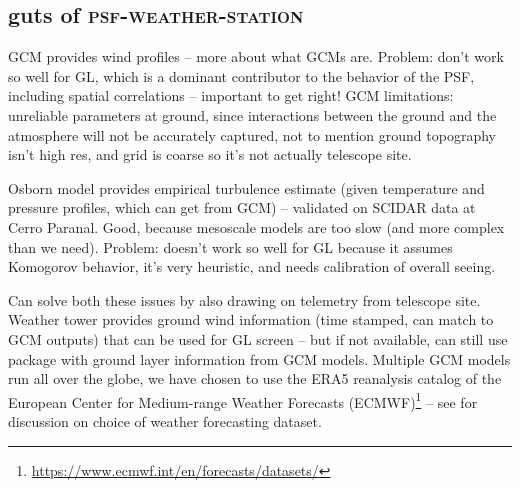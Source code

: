 \documentclass[twocolumn]{aastex631}
\newcommand{\psfws}{\textsc{psf-weather-station}\xspace}
\newcommand{\osborn}{OS18\xspace}
\begin{document}
\subsection{guts of \psfws}

GCM provides wind profiles -- more about what GCMs are.
Problem: don't work so well for GL, which is a dominant contributor to the behavior of the PSF, including spatial correlations -- important to get right!
GCM limitations: unreliable parameters at ground, since interactions between the ground and the atmosphere will not be accurately captured, not to mention ground topography isn't high res, and grid is coarse so it's not actually telescope site. 

Osborn model provides empirical turbulence estimate (given temperature and pressure profiles, which can get from GCM)  -- validated on SCIDAR data \citep{osborn_optical_2018} at Cerro Paranal. 
Good, because mesoscale models are too slow (and more complex than we need).
Problem: doesn't work so well for GL because it assumes Komogorov behavior, it's very heuristic, and needs calibration of overall seeing.



Can solve both these issues by also drawing on telemetry from telescope site. 
Weather tower provides ground wind information (time stamped, can match to GCM outputs) that can be used for GL screen -- but if not available, can still use package with ground layer information from GCM models.
Multiple GCM models run all over the globe, we have chosen to use the ERA5 reanalysis catalog of the European Center for Medium-range Weather Forecasts (ECMWF)\footnote{\url{https://www.ecmwf.int/en/forecasts/datasets/}} -- see  for discussion on choice of weather forecasting dataset.
\end{document}
